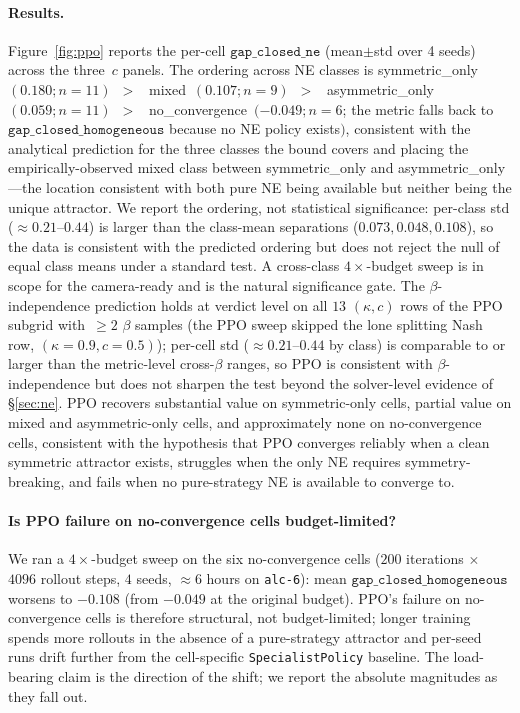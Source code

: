 \documentclass{anvil-paper}
\begin{document}
\paragraph{Results.}
Figure~\ref{fig:ppo} reports the per-cell $\texttt{gap\_closed\_ne}$
(mean$\pm$std over 4 seeds) across the three~$c$ panels. The ordering across
NE classes is
\textsf{symmetric\_only}~$(0.180;n{=}11)$~$>$~%
\textsf{mixed}~$(0.107;n{=}9)$~$>$~%
\textsf{asymmetric\_only}~$(0.059;n{=}11)$~$>$~%
\textsf{no\_convergence}~$(-0.049;n{=}6$; the metric falls back to
$\texttt{gap\_closed\_homogeneous}$ because no NE policy exists$)$,
consistent with the analytical prediction for the three classes the
bound covers and placing the empirically-observed \textsf{mixed} class
between \textsf{symmetric\_only} and \textsf{asymmetric\_only}---the
location consistent with both pure NE being available but neither being
the unique attractor. We report the ordering, not statistical
significance: per-class std ($\approx 0.21$--$0.44$) is larger than the
class-mean separations ($0.073, 0.048, 0.108$), so the data is
consistent with the predicted ordering but does not reject the null of
equal class means under a standard test. A cross-class
$4{\times}$-budget sweep is in scope for the camera-ready and is the
natural significance gate. The $\beta$-independence prediction holds at verdict
level on all $13$ $(\kappa,c)$ rows of the PPO subgrid with~$\geq 2$ $\beta$ samples (the PPO sweep skipped the lone splitting Nash row, $(\kappa{=}0.9, c{=}0.5)$); per-cell
std ($\approx 0.21$--$0.44$ by class) is comparable to or larger than the
metric-level cross-$\beta$ ranges, so PPO is consistent with
$\beta$-independence but does not sharpen the test beyond the
solver-level evidence of \S\ref{sec:ne}. PPO recovers substantial value on
symmetric-only cells, partial value on mixed and asymmetric-only cells,
and approximately none on no-convergence cells, consistent with the
hypothesis that PPO converges reliably when a clean symmetric attractor
exists, struggles when the only NE requires symmetry-breaking, and fails
when no pure-strategy NE is available to converge to.

\paragraph{Is PPO failure on no-convergence cells budget-limited?}
We ran a $4{\times}$-budget sweep on the six no-convergence cells
($200$ iterations $\times$ $4096$ rollout steps, $4$ seeds, $\approx 6$ hours
on \texttt{alc-6}): mean $\texttt{gap\_closed\_homogeneous}$ worsens to
$-0.108$ (from $-0.049$ at the original budget). PPO's failure on
no-convergence cells is therefore structural, not budget-limited; longer
training spends more rollouts in the absence of a pure-strategy attractor
and per-seed runs drift further from the cell-specific
\texttt{SpecialistPolicy} baseline. The load-bearing claim is the direction
of the shift; we report the absolute magnitudes as they fall out.
\end{document}
